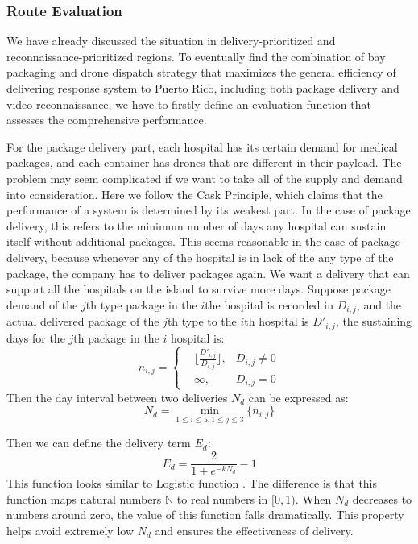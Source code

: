 \documentclass{mcmthesis}
\begin{document}
\subsubsection{Route Evaluation}
We have already discussed the situation in delivery-prioritized and reconnaissance-prioritized regions. To eventually find the combination of bay packaging and drone dispatch strategy that maximizes the general efficiency of delivering response system to Puerto Rico, including both package delivery and video reconnaissance, we have to firstly define an evaluation function that assesses the comprehensive performance. 

For the package delivery part, each hospital has its certain demand for medical packages, and each container has drones that are different in their payload. The problem may seem complicated if we want to take all of the supply and demand into consideration. Here we follow the Cask Principle, which claims that the performance of a system is determined by its weakest part. In the case of package delivery, this refers to the minimum number of days any hospital can sustain itself without additional packages. This seems reasonable in the case of package delivery, because whenever any of the hospital is in lack of the any type of the package, the company has to deliver packages again. We want a delivery that can support all the hospitals on the island to survive more days. Suppose package demand of the $j$th type package in the $i$the hospital is recorded in $D_{i,j}$, and the actual delivered package of the $j$th type to the $i$th hospital is $D'_{i,j}$, the sustaining days for the $j$th package in the $i$ hospital is:
\begin{equation}
    n_{i,j} = \left\{
    \begin{aligned}
    &\biggl\lfloor\frac{D'_{i,j}}{D_{i,j}}\biggr\rfloor, &D_{i,j}\neq 0 \\
    &\infty, &D_{i,j}=0
    \end{aligned}
    \right.
\end{equation}
Then the day interval between two deliveries $N_d$ can be expressed as:
\begin{equation}
    N_d = \min\limits_{1\leq i\leq 5, 1\leq j\leq 3}\{n_{i,j}\}
\end{equation}

Then we can define the delivery term $E_d$:
\begin{equation}
    E_d = \frac{2}{1+e^{-kN_d}}-1
    \label{Equ:dlev}
\end{equation}
This function looks similar to Logistic function \cite{LogisticFunction}. The difference is that this function maps natural numbers $\mathbb{N}$ to real numbers in $[0,1)$. When $N_d$ decreases to numbers around zero, the value of this function falls dramatically. This property helps avoid extremely low $N_d$ and ensures the effectiveness of delivery. 
\end{document}
